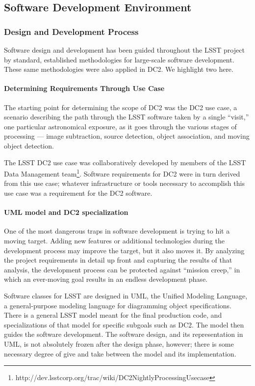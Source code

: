 
\subsection{Software Development Environment}

\subsubsection{Design and Development Process}

Software design and development has been guided throughout the LSST project by
standard, established methodologies for large-scale software
development. These same methodologies were also applied in DC2. We highlight two
here.

\paragraph{Determining Requirements Through Use Case}

The starting point for determining the scope of DC2 was the DC2 use case, a
scenario describing the path through the LSST software taken by a single
``visit,'' one particular astronomical exposure, as it goes through the various
stages of processing --- image subtraction, source detection, object
association, and moving object detection.

The LSST DC2 use case was collaboratively developed by members of the LSST Data
Management 
team\footnote{http://dev.lsstcorp.org/trac/wiki/DC2NightlyProcessingUsecase}.
Software requirements for DC2 were in turn derived from this use case; whatever
infrastructure or tools necessary to accomplish this use case was a requirement
for the DC2 software.

\paragraph{UML model and DC2 specialization}

One of the most dangerous traps in software development is trying to hit a
moving target. Adding new features or additional technologies during the
development process may improve the target, but it also moves it. By analyzing
the project requirements in detail up front and capturing the results of that
analysis, the development process can be protected against ``mission creep,'' in
which an ever-moving goal results in an endless development phase.

Software classes for LSST are designed in UML, the Unified Modeling Language, a
general-purpose modeling language for diagramming object specifications. There
is a general LSST model meant for the final production code, and specializations
of that model for specific subgoals such as DC2. The model then guides the
software development. The software design, and its representation in UML, is not
absolutely frozen after the design phase, however; there is some necessary
degree of give and take between the model and its implementation.

